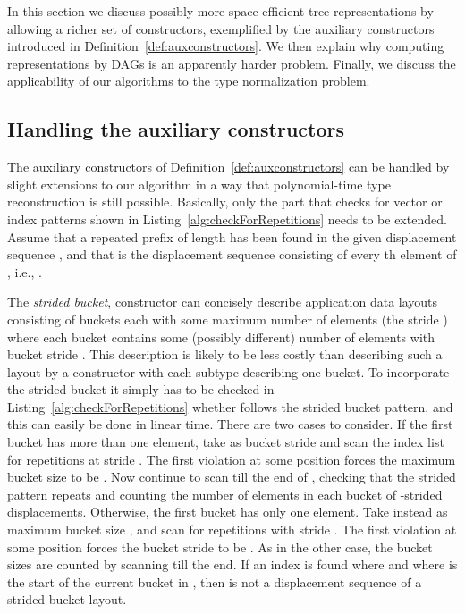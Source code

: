 \documentclass[a4paper,11pt]{article}
\begin{document}
In this section we discuss possibly more space efficient tree
representations by allowing a richer set of constructors, exemplified
by the auxiliary constructors introduced in
Definition~\ref{def:auxconstructors}. We then explain why computing
representations by DAGs is an apparently harder problem. Finally, we
discuss the applicability of our algorithms to the type normalization
problem.

\subsection{Handling the auxiliary constructors}
\label{sec:auxiliary}

The auxiliary constructors of Definition~\ref{def:auxconstructors} can
be handled by slight extensions to our algorithm in a way that
polynomial-time type reconstruction is still possible. Basically, only
the part that checks for vector or index patterns shown in
Listing~\ref{alg:checkForRepetitions} needs to be extended. Assume
that a repeated prefix  of length  has been found in the given
displacement sequence , and that  is the displacement sequence
consisting of every th element of , i.e.,
.

The \emph{strided bucket},  constructor can concisely describe
application data layouts consisting of buckets each with some maximum
number of elements (the stride ) where each bucket contains some
(possibly different) number of elements  with bucket stride
. This description is likely to be less costly than describing such
a layout by a  constructor with each subtype describing one
bucket.  To incorporate the strided bucket it simply has to be checked
in Listing~\ref{alg:checkForRepetitions} whether  follows the
strided bucket pattern, and this can easily be done in linear
time. There are two cases to consider. If the first bucket has more
than one element, take as bucket stride  and scan the
index list for repetitions at stride . The first violation at some
position  forces the maximum bucket size to be . Now
continue to scan till the end of , checking that the  strided
pattern repeats and counting the number of elements  in each
bucket of -strided displacements.  Otherwise, the first bucket has
only one element. Take instead as maximum bucket size ,
and scan for repetitions with stride . The first violation at some
position  forces the bucket stride to be . As in
the other case, the bucket sizes  are counted by scanning 
till the end. If an index  is found where  and
 where  is the start of the current bucket in
, then  is not a displacement sequence of a strided bucket
layout.
\end{document}
